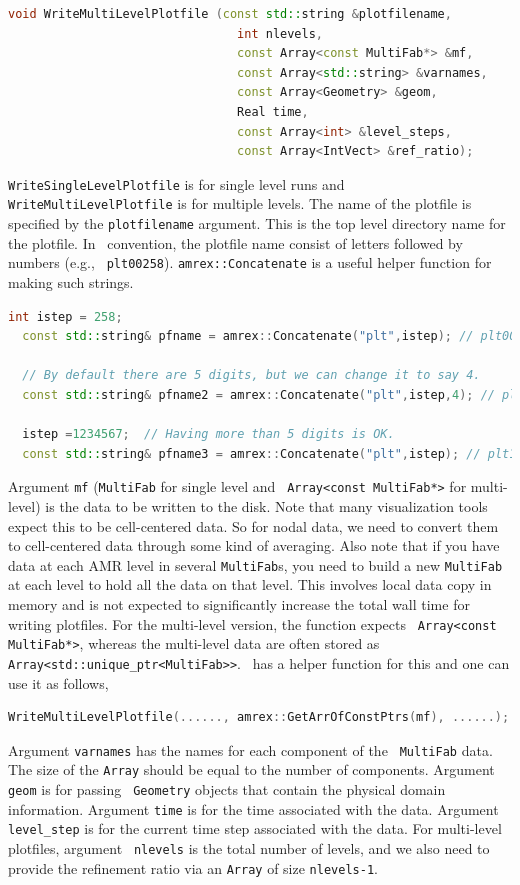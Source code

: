 {{\begin{lstlisting}[language=cpp]
  void WriteMultiLevelPlotfile (const std::string &plotfilename,
                                int nlevels,
                                const Array<const MultiFab*> &mf,
                                const Array<std::string> &varnames,
                                const Array<Geometry> &geom,
                                Real time,
                                const Array<int> &level_steps,
                                const Array<IntVect> &ref_ratio);
\end{lstlisting}
{\tt WriteSingleLevelPlotfile} is for single level runs and {\tt
WriteMultiLevelPlotfile} is for multiple levels.  The name of the
plotfile is specified by the {\tt plotfilename} argument.  This is the
top level directory name for the plotfile.  In \amrex\ convention, the
plotfile name consist of letters followed by numbers (e.g., {\tt
plt00258}).  {\tt amrex::Concatenate} is a useful helper function for
making such strings.
\begin{lstlisting}[language=cpp]
  int istep = 258;
  const std::string& pfname = amrex::Concatenate("plt",istep); // plt00258

  // By default there are 5 digits, but we can change it to say 4.
  const std::string& pfname2 = amrex::Concatenate("plt",istep,4); // plt0258  

  istep =1234567;  // Having more than 5 digits is OK.
  const std::string& pfname3 = amrex::Concatenate("plt",istep); // plt12344567
\end{lstlisting}
Argument {\tt mf} ({\tt MultiFab} for single level and {\tt
  Array<const MultiFab*>} for multi-level) is the data to be written
to the disk.  Note that many visualization tools expect this to be
cell-centered data.  So for nodal data, we need to convert them to
cell-centered data through some kind of averaging.  Also note that if
you have data at each AMR level in several {\tt MultiFab}s, you need
to build a new {\tt MultiFab} at each level to hold all the data on
that level.  This involves local data copy in memory and is not
expected to significantly increase the total wall time for writing
plotfiles.  For the multi-level version, the function expects {\tt
  Array<const MultiFab*>}, whereas the multi-level data are often
stored as {\tt Array<std::unique\_ptr<MultiFab>>}.  \amrex\ has a
helper function for this and one can use it as follows,
\begin{lstlisting}[language=cpp]
   WriteMultiLevelPlotfile(......, amrex::GetArrOfConstPtrs(mf), ......);
\end{lstlisting}
Argument {\tt varnames} has the names for each component of the {\tt
MultiFab} data.  The size of the {\tt Array} should be equal to the
number of components.  Argument {\tt geom} is for passing {\tt
Geometry} objects that contain the physical domain
information. Argument {\tt time} is for the time associated with the
data.  Argument {\tt level\_step} is for the current time step
associated with the data.  For multi-level plotfiles, argument {\tt
nlevels} is the total number of levels, and we also need to provide
the refinement ratio via an {\tt Array} of size {\tt nlevels-1}.

}}
